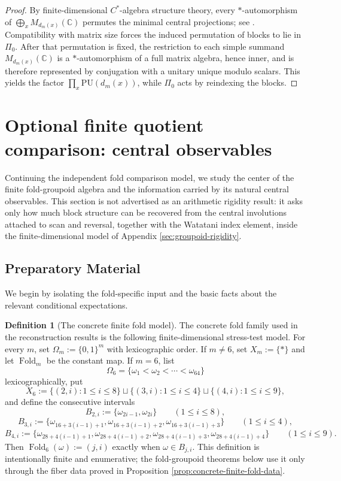 \documentclass[12pt,a4paper]{article}
\theoremstyle{plain}
\theoremstyle{definition}
\newtheorem{definition}[theorem]{Definition}
\numberwithin{equation}{section}
\newcommand{\CC}{\mathbb{C}}
\newcommand{\Fold}{\operatorname{Fold}}
\begin{document}
\begin{proof}
By finite-dimensional \(C^\ast\)-algebra structure theory, every \(\ast\)-automorphism of \(\bigoplus_x M_{d_m(x)}(\CC)\) permutes the minimal central projections; see \cite[Section 2.1]{BrownOzawa2008}. Compatibility with matrix size forces the induced permutation of blocks to lie in \(\Pi_0\). After that permutation is fixed, the restriction to each simple summand \(M_{d_m(x)}(\CC)\) is a \(\ast\)-automorphism of a full matrix algebra, hence inner, and is therefore represented by conjugation with a unitary unique modulo scalars. This yields the factor \(\prod_x\mathrm{PU}(d_m(x))\), while \(\Pi_0\) acts by reindexing the blocks.
\end{proof}



\section{Optional finite quotient comparison: central observables}\label{sec:central-idempotents}
Continuing the independent fold comparison model, we study the center of the finite fold-groupoid algebra and the information carried by its natural central observables.  This section is not advertised as an arithmetic rigidity result: it asks only how much block structure can be recovered from the central involutions attached to scan and reversal, together with the Watatani index element, inside the finite-dimensional model of Appendix \ref{sec:groupoid-rigidity}.

\subsection{Preparatory Material}
We begin by isolating the fold-specific input and the basic facts about the relevant conditional expectations.

\begin{definition}[The concrete finite fold model]\label{def:concrete-finite-fold-model}
The concrete fold family used in the reconstruction results is the following finite-dimensional stress-test model. For every \(m\), set \(\Omega_m:=\{0,1\}^m\) with lexicographic order. If \(m\ne6\), set \(X_m:=\{\ast\}\) and let \(\Fold_m\) be the constant map. If \(m=6\), list
\[
\Omega_6=\{\omega_1<\omega_2<\cdots<\omega_{64}\}
\]
lexicographically, put
\[
X_6:=\{(2,i):1\le i\le8\}\sqcup\{(3,i):1\le i\le4\}\sqcup\{(4,i):1\le i\le9\},
\]
and define the consecutive intervals
\[
B_{2,i}:=\{\omega_{2i-1},\omega_{2i}\}\qquad(1\le i\le8),
\]
\[
B_{3,i}:=\{\omega_{16+3(i-1)+1},\omega_{16+3(i-1)+2},\omega_{16+3(i-1)+3}\}\qquad(1\le i\le4),
\]
\[
B_{4,i}:=\{\omega_{28+4(i-1)+1},\omega_{28+4(i-1)+2},\omega_{28+4(i-1)+3},\omega_{28+4(i-1)+4}\}\qquad(1\le i\le9).
\]
Then \(\Fold_6(\omega):=(j,i)\) exactly when \(\omega\in B_{j,i}\). This definition is intentionally finite and enumerative; the fold-groupoid theorems below use it only through the fiber data proved in Proposition \ref{prop:concrete-finite-fold-data}.
\end{definition}
\end{document}
